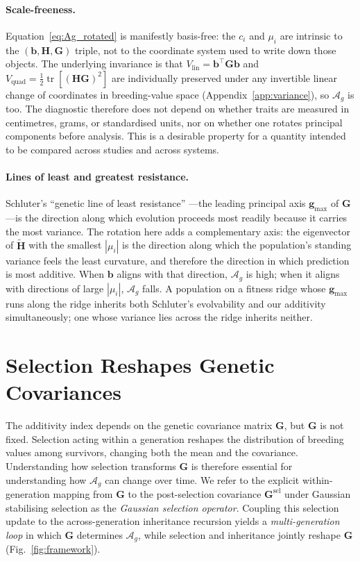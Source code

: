 \documentclass[9pt,twocolumn,twoside,lineno]{gsajnl}
\newcommand{\vect}[1]{\boldsymbol{#1}}
\newcommand{\mat}[1]{\mathbf{#1}}
\newcommand{\tr}{\ensuremath{\operatorname{tr}}\xspace}
\newcommand{\Ag}{\ensuremath{\mathcal{A}_{g}}\xspace}
\newcommand{\Gsel}{\ensuremath{\mat{G}^{\text{sel}}}\xspace}
\newcommand{\Vlin}{\ensuremath{V_{\text{lin}}}\xspace}
\newcommand{\Vquad}{\ensuremath{V_{\text{quad}}}\xspace}
\begin{document}
\paragraph{Scale-freeness.}
Equation~\eqref{eq:Ag_rotated} is manifestly basis-free: the $c_i$ and $\mu_i$ are intrinsic to the $(\vect{b},\mat{H},\mat{G})$ triple, not to the coordinate system used to write down those objects. The underlying invariance is that $\Vlin = \vect{b}^{\top}\mat{G}\vect{b}$ and $\Vquad = \tfrac{1}{2}\tr[(\mat{H}\mat{G})^2]$ are individually preserved under any invertible linear change of coordinates in breeding-value space (Appendix~\ref{app:variance}), so \Ag is too. The diagnostic therefore does not depend on whether traits are measured in centimetres, grams, or standardised units, nor on whether one rotates principal components before analysis. This is a desirable property for a quantity intended to be compared across studies and across systems.

\paragraph{Lines of least and greatest resistance.}
Schluter's ``genetic line of least resistance'' \citep{Schluter1996}---the leading principal axis $\vect{g}_{\max}$ of $\mat{G}$---is the direction along which evolution proceeds most readily because it carries the most variance. The rotation here adds a complementary axis: the eigenvector of $\tilde{\mat{H}}$ with the smallest $|\mu_i|$ is the direction along which the population's standing variance feels the least curvature, and therefore the direction in which prediction is most additive. When $\vect{b}$ aligns with that direction, \Ag is high; when it aligns with directions of large $|\mu_i|$, \Ag falls. A population on a fitness ridge whose $\vect{g}_{\max}$ runs along the ridge inherits both Schluter's evolvability and our additivity simultaneously; one whose variance lies across the ridge inherits neither.

\section{Selection Reshapes Genetic Covariances}
\label{sec:selection}

The additivity index depends on the genetic covariance matrix $\mat{G}$, but $\mat{G}$ is not fixed. Selection acting within a generation reshapes the distribution of breeding values among survivors, changing both the mean and the covariance. Understanding how selection transforms $\mat{G}$ is therefore essential for understanding how \Ag can change over time. We refer to the explicit within-generation mapping from $\mat{G}$ to the post-selection covariance $\Gsel$ under Gaussian stabilising selection as the \emph{Gaussian selection operator}. Coupling this selection update to the across-generation inheritance recursion yields a \emph{multi-generation loop} in which $\mat{G}$ determines \Ag, while selection and inheritance jointly reshape $\mat{G}$ (Fig.~\ref{fig:framework}).
\end{document}
